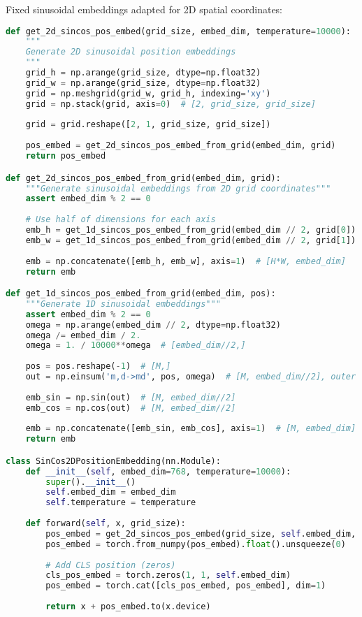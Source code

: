 Fixed sinusoidal embeddings adapted for 2D spatial coordinates:

\begin{lstlisting}[language=Python, caption=2D sinusoidal position embeddings]
def get_2d_sincos_pos_embed(grid_size, embed_dim, temperature=10000):
    """
    Generate 2D sinusoidal position embeddings
    """
    grid_h = np.arange(grid_size, dtype=np.float32)
    grid_w = np.arange(grid_size, dtype=np.float32)
    grid = np.meshgrid(grid_w, grid_h, indexing='xy')
    grid = np.stack(grid, axis=0)  # [2, grid_size, grid_size]
    
    grid = grid.reshape([2, 1, grid_size, grid_size])
    
    pos_embed = get_2d_sincos_pos_embed_from_grid(embed_dim, grid)
    return pos_embed

def get_2d_sincos_pos_embed_from_grid(embed_dim, grid):
    """Generate sinusoidal embeddings from 2D grid coordinates"""
    assert embed_dim % 2 == 0
    
    # Use half of dimensions for each axis
    emb_h = get_1d_sincos_pos_embed_from_grid(embed_dim // 2, grid[0])  # H
    emb_w = get_1d_sincos_pos_embed_from_grid(embed_dim // 2, grid[1])  # W
    
    emb = np.concatenate([emb_h, emb_w], axis=1)  # [H*W, embed_dim]
    return emb

def get_1d_sincos_pos_embed_from_grid(embed_dim, pos):
    """Generate 1D sinusoidal embeddings"""
    assert embed_dim % 2 == 0
    omega = np.arange(embed_dim // 2, dtype=np.float32)
    omega /= embed_dim / 2.
    omega = 1. / 10000**omega  # [embed_dim//2,]
    
    pos = pos.reshape(-1)  # [M,]
    out = np.einsum('m,d->md', pos, omega)  # [M, embed_dim//2], outer product
    
    emb_sin = np.sin(out)  # [M, embed_dim//2]
    emb_cos = np.cos(out)  # [M, embed_dim//2]
    
    emb = np.concatenate([emb_sin, emb_cos], axis=1)  # [M, embed_dim]
    return emb

class SinCos2DPositionEmbedding(nn.Module):
    def __init__(self, embed_dim=768, temperature=10000):
        super().__init__()
        self.embed_dim = embed_dim
        self.temperature = temperature
    
    def forward(self, x, grid_size):
        pos_embed = get_2d_sincos_pos_embed(grid_size, self.embed_dim, self.temperature)
        pos_embed = torch.from_numpy(pos_embed).float().unsqueeze(0)
        
        # Add CLS position (zeros)
        cls_pos_embed = torch.zeros(1, 1, self.embed_dim)
        pos_embed = torch.cat([cls_pos_embed, pos_embed], dim=1)
        
        return x + pos_embed.to(x.device)
\end{lstlisting}

